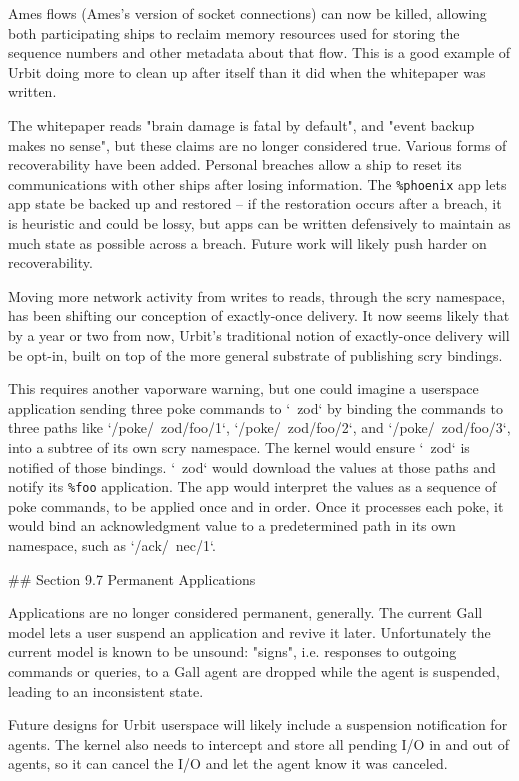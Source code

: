 \documentclass[twoside]{article}
\begin{document}
Ames flows (Ames's version of socket connections) can now be killed, allowing both participating ships to reclaim memory resources used for storing the sequence numbers and other metadata about that flow.  This is a good example of Urbit doing more to clean up after itself than it did when the whitepaper was written.

The whitepaper reads "brain damage is fatal by default", and "event backup makes no sense", but these claims are no longer considered true.  Various forms of recoverability have been added.  Personal breaches allow a ship to reset its communications with other ships after losing information.  The \lstinline[style=inlinecode]{%phoenix} app lets app state be backed up and restored – if the restoration occurs after a breach, it is heuristic and could be lossy, but apps can be written defensively to maintain as much state as possible across a breach.  Future work will likely push harder on recoverability.

Moving more network activity from writes to reads, through the scry namespace, has been shifting our conception of exactly-once delivery.  It now seems likely that by a year or two from now, Urbit's traditional notion of exactly-once delivery will be opt-in, built on top of the more general substrate of publishing scry bindings.

This requires another vaporware warning, but one could imagine a userspace application sending three poke commands to `~zod` by binding the commands to three paths like `/poke/~zod/foo/1`, `/poke/~zod/foo/2`, and `/poke/~zod/foo/3`, into a subtree of its own scry namespace.  The kernel would ensure `~zod` is notified of those bindings.  `~zod` would download the values at those paths and notify its \lstinline[style=inlinecode]{%foo} application.  The app would interpret the values as a sequence of poke commands, to be applied once and in order.  Once it processes each poke, it would bind an acknowledgment value to a predetermined path in its own namespace, such as `/ack/~nec/1`.  

## Section 9.7 Permanent Applications

Applications are no longer considered permanent, generally.  The current Gall model lets a user suspend an application and revive it later.  Unfortunately the current model is known to be unsound: "signs", i.e. responses to outgoing commands or queries, to a Gall agent are dropped while the agent is suspended, leading to an inconsistent state.

Future designs for Urbit userspace will likely include a suspension notification for agents.  The kernel also needs to intercept and store all pending I/O in and out of agents, so it can cancel the I/O and let the agent know it was canceled.
\end{document}
